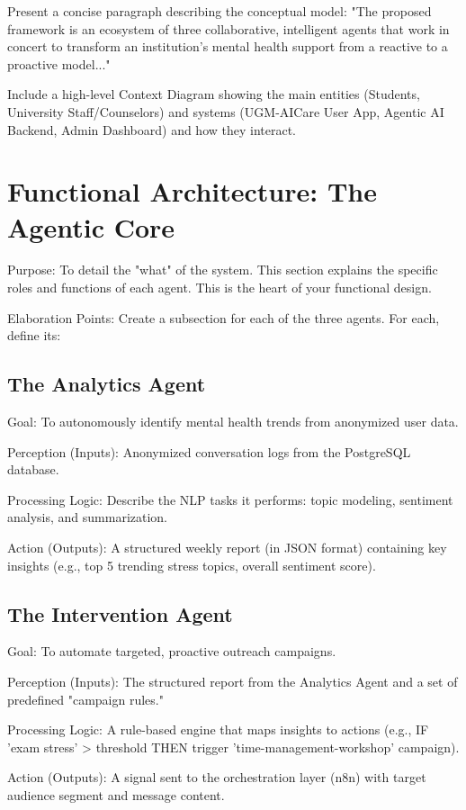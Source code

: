 Present a concise paragraph describing the conceptual model: "The proposed framework is an ecosystem of three collaborative, intelligent agents that work in concert to transform an institution's mental health support from a reactive to a proactive model..."

Include a high-level Context Diagram showing the main entities (Students, University Staff/Counselors) and systems (UGM-AICare User App, Agentic AI Backend, Admin Dashboard) and how they interact.

\section{Functional Architecture: The Agentic Core}
Purpose: To detail the "what" of the system. This section explains the specific roles and functions of each agent. This is the heart of your functional design.

Elaboration Points: Create a subsection for each of the three agents. For each, define its:

\subsection{The Analytics Agent}

Goal: To autonomously identify mental health trends from anonymized user data.

Perception (Inputs): Anonymized conversation logs from the PostgreSQL database.

Processing Logic: Describe the NLP tasks it performs: topic modeling, sentiment analysis, and summarization.

Action (Outputs): A structured weekly report (in JSON format) containing key insights (e.g., top 5 trending stress topics, overall sentiment score).

\subsection{The Intervention Agent}

Goal: To automate targeted, proactive outreach campaigns.

Perception (Inputs): The structured report from the Analytics Agent and a set of predefined "campaign rules."

Processing Logic: A rule-based engine that maps insights to actions (e.g., IF 'exam stress' > threshold THEN trigger 'time-management-workshop' campaign).

Action (Outputs): A signal sent to the orchestration layer (n8n) with target audience segment and message content.

